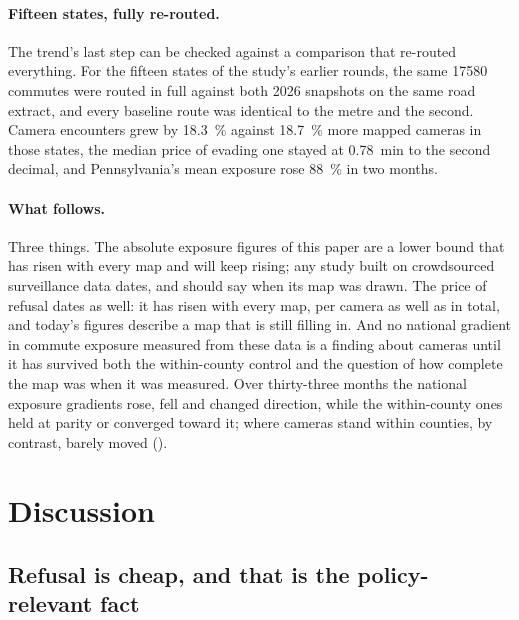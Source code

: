 \documentclass[11pt,twoside]{article}
\begin{document}
\paragraph{Fifteen states, fully re-routed.} The trend's last step can be checked against a
comparison that re-routed everything. For the fifteen states of the study's earlier rounds,
the same \num{17580} commutes were routed in full against both 2026 snapshots on the same
road extract, and every baseline route was identical to the metre and the second. Camera
encounters grew by \SI{18.3}{\percent} against \SI{18.7}{\percent} more mapped cameras in those states, the
median price of evading one stayed at \SI{0.78}{\minute} to the second decimal, and
Pennsylvania's mean exposure rose \SI{88}{\percent} in two months.

\paragraph{What follows.} Three things. The absolute exposure figures of this paper are a
lower bound that has risen with every map and will keep rising; any study built on
crowdsourced surveillance data dates, and should say when its map was drawn. The price of
refusal dates as well: it has risen with every map, per camera as well as in total, and
today's figures describe a map that is still filling in. And no
national gradient in commute exposure measured from these data is a finding about cameras
until it has survived both the within-county control and the question of how complete the map
was when it was measured. Over thirty-three months the national exposure gradients rose, fell
and changed direction, while the within-county ones held at parity or converged toward it;
where cameras stand within counties, by contrast, barely moved ().

\section{Discussion}
\label{sec:discussion}

\subsection{Refusal is cheap, and that is the policy-relevant fact}
\end{document}
